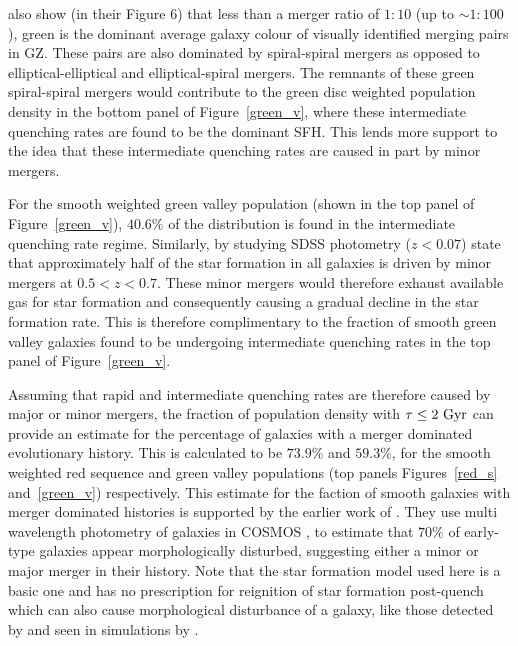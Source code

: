  \citet{Darg10a} also show (in their Figure 6) that less than a merger ratio of $1:10$ (up to $\sim 1:100$), green is the dominant average galaxy colour of visually identified merging pairs in GZ. These pairs are also dominated by spiral-spiral mergers as opposed to elliptical-elliptical and elliptical-spiral mergers. The remnants of these green spiral-spiral mergers would contribute to the green disc weighted population density in the bottom panel of Figure~\ref{green_v}, where these intermediate quenching rates are found to be the dominant SFH. This lends more support to the idea that these intermediate quenching rates are caused in part by minor mergers. 

For the smooth weighted green valley population (shown in the top panel of Figure~\ref{green_v}), $40.6\%$ of the distribution is found in the intermediate quenching rate regime. Similarly, \citet{kaviraj14a, kaviraj14b} by studying SDSS photometry ($z<0.07$) state that approximately half of the star formation in all galaxies is driven by minor mergers at $0.5 < z < 0.7$. These minor mergers would therefore exhaust available gas for star formation and consequently causing a gradual decline in the star formation rate. This is therefore complimentary to the fraction of smooth green valley galaxies found to be undergoing intermediate quenching rates in the top panel of Figure~\ref{green_v}.

Assuming that rapid and intermediate quenching rates are therefore caused by major or minor mergers, the fraction of population density with $\tau \leq 2~\rm{Gyr}$ can provide an estimate for the percentage of galaxies with a merger dominated evolutionary history.  This is calculated to be $73.9\%$ and $59.3\%$, for the smooth weighted red sequence and green valley populations (top panels Figures~\ref{red_s} and~\ref{green_v}) respectively. This estimate for the faction of smooth galaxies with merger dominated histories is supported by the earlier work of \cite{kaviraj11}. They use multi wavelength photometry of galaxies in COSMOS \citep{Scoville07}, to estimate that $70\%$ of early-type galaxies appear morphologically disturbed, suggesting either a minor or major merger in their history. Note that the star formation model used here is a basic one and has no prescription for reignition of star formation post-quench which can also cause morphological disturbance of a galaxy, like those detected by \cite{kaviraj11} and seen in simulations by \cite{pontzen16}.

